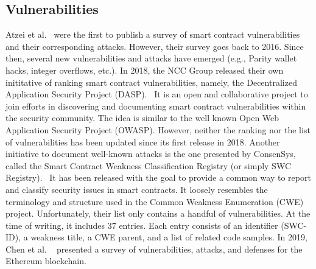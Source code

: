     \subsection{Vulnerabilities}
        Atzei et al.~\cite{atzei2017survey} were the first to publish a survey of smart contract vulnerabilities and their corresponding attacks.
        However, their survey goes back to 2016.
        Since then, several new vulnerabilities and attacks have emerged (e.g., Parity wallet hacks, integer overflows, etc.).
        In 2018, the NCC Group released their own inititative of ranking smart contract vulnerabilities, namely, the Decentralized Application Security Project (DASP).~\cite{dasp}
        It is an open and collaborative project to join efforts in discovering and documenting smart contract vulnerabilities within the security community.
        The idea is similar to the well known Open Web Application Security Project (OWASP).
        However, neither the ranking nor the list of vulnerabilities has been updated since its first release in 2018.
        Another initiative to document well-known attacks is the one presented by ConsenSys, called the Smart Contract Weakness Classification Registry (or simply SWC Registry).~\cite{swcregistry}
        It has been released with the goal to provide a common way to report and classify security issues in smart contracts.
        It loosely resembles the terminology and structure used in the Common Weakness Enumeration (CWE) project.
        Unfortunately, their list only contains a handful of vulnerabilities.
        At the time of writing, it includes 37 entries.
        Each entry consists of an identifier (SWC-ID), a weakness title, a CWE parent, and a list of related code samples.
        In 2019, Chen et al. ~\cite{chen2020survey} presented a survey of vulnerabilities, attacks, and defenses for the Ethereum blockchain.

